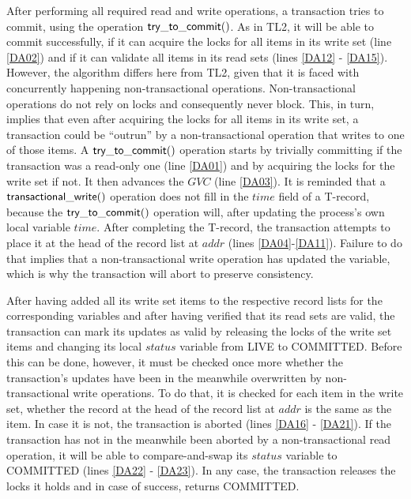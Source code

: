 \documentclass[11pt,letterpaper]{article}
\begin{document}
After  performing all  required read  and write  operations,  a transaction
tries to commit, using the operation  ${\sf try\_to\_commit()}$. As in TL2,
it will be able to commit successfully, if it can acquire  
the locks for all items in its write set (line \ref{DA02}) 
and if it can validate all items in its read sets 
(lines \ref{DA12} - \ref{DA15}). However, the algorithm  differs 
here from TL2, given that 
it is faced with concurrently happening non-transactional operations. 
Non-transactional operations do not rely on locks and consequently never block. 
This, in turn, implies 
that even after acquiring the locks for all items in its write set, 
a transaction could be {}``outrun'' by 
a non-transactional operation that writes to one of those items. 
A ${\sf try\_to\_commit()}$ operation 
starts by trivially committing if the transaction was a read-only one 
(line \ref{DA01}) and by acquiring 
the locks for the write set if not. 
It then advances the $\mathit{GVC}$ (line \ref{DA03}). It is 
reminded that a ${\sf transactional\_write()}$ operation does not 
fill in the $\mathit{time}$ field of a T-record, 
because the ${\sf try\_to\_commit()}$ operation will, 
after updating the process{}'s own local variable 
$\mathit{time}$. After completing the T-record, 
the transaction attempts to place it at the head of the 
record list at $\mathit{addr}$ (lines \ref{DA04}-\ref{DA11}).
 Failure to do that implies that a non-transactional 
write operation has updated the variable, which is why the 
transaction will abort to preserve consistency. 

After having added all its write set items to the respective 
record lists for the corresponding variables 
and after having verified that its read sets are valid, the 
transaction can mark its updates as valid by 
releasing the locks of the write set items and changing its 
local $\mathit{status}$ variable from LIVE to COMMITTED.  
Before this can be done, however, it must be checked once more 
 whether the transaction{}'s updates 
have been in the meanwhile overwritten by non-transactional 
write operations. To do that, it is checked 
for each item in the write set, whether the record at the head of 
the record list at $\mathit{addr}$ is the same 
as the item. In case it is not, the transaction is aborted 
(lines \ref{DA16} - \ref{DA21}). If the transaction 
has not in the meanwhile been aborted by a non-transactional 
read operation, it will be able to 
compare-and-swap its $\mathit{status}$ variable to COMMITTED 
(lines \ref{DA22} - \ref{DA23}). In any case, 
the transaction releases the locks it holds and in case of success, 
returns COMMITTED.
\end{document}
